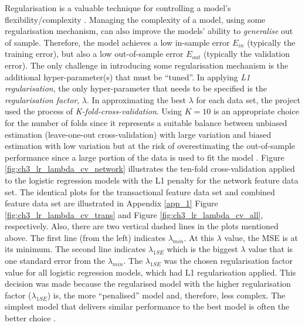 Regularisation is a valuable technique for controlling a model's flexibility/complexity \citep{et2020analytics}. Managing the complexity of a model, using some regularisation mechanism, can also improve the models' ability to \textit{generalise} out of sample. Therefore, the model achieves a low in-sample error $E_{in}$ (typically the training error), but also a low out-of-sample error $E{_{out}}$ (typically the validation error). The only challenge in introducing some regularisation mechanism is the additional hyper-parameter(s) that must be ``tuned''. In applying \textit{L1 regularisation}, the only hyper-parameter that needs to be specified is the \textit{regularisation factor}, $\lambda$. In approximating the best $\lambda$ for each data set, the project used the process of \textit{K-fold-cross-validation}. Using $K = 10$ is an appropriate choice for the number of folds since it represents a suitable balance between unbiased estimation (leave-one-out cross-validation) with large variation and biased estimation with low variation but at the risk of overestimating the out-of-sample performance since a large portion of
the data is used to fit the model \citep{et2020analytics, friedman2001elements}. Figure \ref{fig:ch3_lr_lambda_cv_network} illustrates the ten-fold cross-validation applied to the logistic regression models with the L1 penalty for the network feature data set. The identical plots for the transactional feature data set and combined feature data set are illustrated in Appendix \ref{app_1} Figure \ref{fig:ch3_lr_lambda_cv_trans} and Figure \ref{fig:ch3_lr_lambda_cv_all}, respectively. Also, there are two vertical dashed lines in the plots mentioned above. The first line (from the left) indicates $\lambda_{min}$. At this $\lambda$ value, the MSE is at its minimum. The second line indicates $\lambda_{1 SE}$ which is the biggest $\lambda$ value that is one standard error from the $\lambda_{min}$. The $\lambda_{1 SE}$ was the chosen regularisation factor value for all logistic regression models, which had L1 regularisation applied. This decision was made because the regularised model with the higher regularisation factor ($\lambda_{1 SE}$) is, the more ``penalised'' model and, therefore, less complex. The simplest model that delivers similar performance to the best model is often the better choice \citep{friedman2001elements}.      

